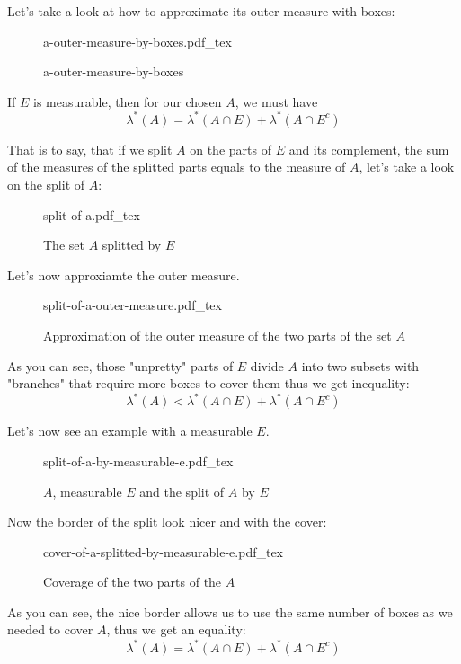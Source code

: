 \documentclass[a4paper]{article}
\newcommand{\incfig}[1]{%
    \def\svgwidth{\columnwidth}
    {#1.pdf_tex}
}
\begin{document}
Let's take a look at how to approximate its outer measure with boxes:
\begin{figure}[H]
    \centering
    \incfig{a-outer-measure-by-boxes}
    \caption{a-outer-measure-by-boxes}
    \label{fig:a-outer-measure-by-boxes}
\end{figure}

If $E$ is measurable, then for our chosen  $A$, we must have
 \[
\lambda^*(A) = \lambda^*(A \cap E) + \lambda^*(A \cap E^c)
\] 

That is to say, that if we split $A$ on the parts of  $E$ and its complement, the sum of the measures of the splitted parts equals to the measure of $A$, let's take a look on the split of $A$:
\begin{figure}[H]
    \centering
    \incfig{split-of-a}
    \caption{The set $A$ splitted by $E$}
    \label{fig:split-of-a}
\end{figure}

Let's now approxiamte the outer measure.

\begin{figure}[H]
    \centering
    \incfig{split-of-a-outer-measure}
    \caption{Approximation of the outer measure of the two parts of the set $A$}
    \label{fig:split-of-a-outer-measure}
\end{figure}
As you can see, those "unpretty" parts of $E$ divide  $A$ into two subsets with
"branches" that require more boxes to cover them thus we get inequality:
 \[
\lambda^*(A) < \lambda^*(A \cap E) + \lambda^*(A \cap E^c)
\] 

Let's now see an example with a measurable  $E$.

\begin{figure}[H]
    \centering
    \incfig{split-of-a-by-measurable-e}
    \caption{$A$, measurable $E$ and the split of $A$ by $E$}
    \label{fig:split-of-a-by-measurable-e}
\end{figure}

Now the border of the split look nicer and with the cover:
\begin{figure}[H]
    \centering
    \incfig{cover-of-a-splitted-by-measurable-e}
    \caption{Coverage of the two parts of the $A$}
    \label{fig:cover-of-a-splitted-by-measurable-e}
\end{figure}

As you can see, the nice border allows us to use the same number of boxes as we needed to cover $A$, thus we get an equality:
 \[
\lambda^*(A) = \lambda^*(A \cap E) + \lambda^*(A \cap E^c)
\] 
\end{document}
